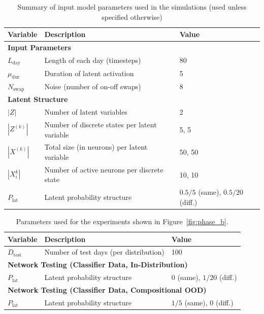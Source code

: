 \documentclass{article}
\begin{document}
\begin{table}[ht]
\centering
\caption{Summary of input model parameters used in the simulations (used unless specified otherwise)}
\label{tab:fig2_parameters}
\begin{tabular}{lll}
\toprule
\textbf{Variable} & \textbf{Description} & \textbf{Value} \\
\midrule
\multicolumn{3}{l}{\textbf{Input Parameters}} \\
\midrule
$L_{\text{day}}$ & Length of each day (timesteps) & 80 \\
$\mu_{\text{dur}}$ & Duration of latent activation & 5 \\
$N_\textrm{swap}$ & Noise (number of on-off swaps) & 8 \\

\midrule
\multicolumn{3}{l}{\textbf{Latent Structure}} \\
\midrule
$|Z|$ & Number of latent variables & 2 \\
$|Z^{(k)}|$ & Number of discrete states per latent variable & 5, 5\\
$|X^{(k)}|$ & Total size (in neurons) per latent variable & 50, 50 \\
$|X^{k}_i|$  & Number of active neurons per discrete state & 10, 10 \\
$P_{\text{lat}}$ & Latent probability structure & $0.5/5$ (same), $0.5/20$ (diff.) \\
\bottomrule
\end{tabular}
\end{table}
\begin{table}[ht]
\centering
\caption{Parameters used for the experiments shown in Figure~\ref{fig:phase_b}.}
\label{tab:fig3_parameters}
\begin{tabular}{lll}
\toprule
\textbf{Variable} & \textbf{Description} & \textbf{Value} \\
\midrule
$D_{\text{test}}$ & Number of test days (per distribution) & 100 \\
\midrule
\multicolumn{3}{l}{\textbf{Network Testing (Classifier Data, In-Distribution)}} \\
\midrule
$P_{\text{lat}}$ & Latent probability structure & $0$ (same), $1/20$ (diff.) \\

\midrule
\multicolumn{3}{l}{\textbf{Network Testing (Classifier Data, Compositional OOD)}} \\
\midrule
$P_{\text{lat}}$ & Latent probability structure & $1/5$ (same), $0$ (diff.) \\
\bottomrule
\end{tabular}
\end{table}
\end{document}
